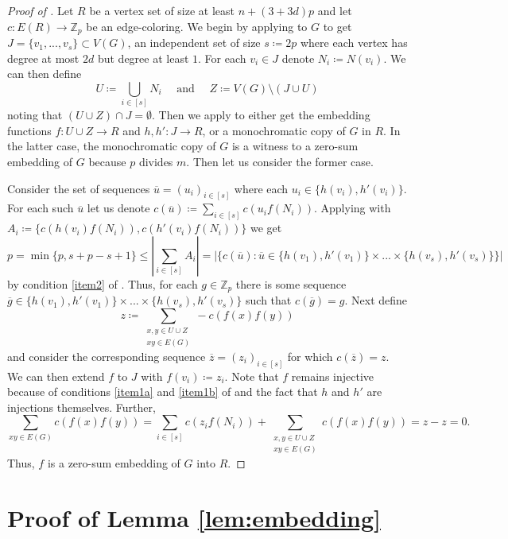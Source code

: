 \documentclass{article}
\newcommand\ZZ{{\mathbb Z}}
\theoremstyle{definition}
\begin{document}
\begin{proof}[Proof of ]

Let $R$ be a vertex set of size at least $n+(3+3d)p$ and let $c:E(R)\to \ZZ_p$ be an edge-coloring. We begin by applying 
 to $G$ to get $J=\{v_1,...,v_s\}\subset V(G)$, an independent set of size $s\coloneqq 2p$ where each vertex has degree at most $2d$ but degree at least $1$. For each $v_i\in J$ denote $N_i\coloneqq N(v_i)$. We can then define $$U\coloneqq \bigcup_{i\in [s]}N_i  \quad \text{ and } \quad Z\coloneqq V(G)\setminus (J\cup U)$$ noting that $(U\cup Z)\cap J=\emptyset$. Then we apply  to either get the embedding functions $f:U\cup Z\to R$ and $h,h':J\to R$, or a monochromatic copy of $G$ in $R$. In the latter case, the monochromatic copy of $G$ is a witness to a zero-sum embedding of $G$ because $p$ divides $m$. Then let us consider the former case.

Consider the set of sequences $\overline u=(u_i)_{i\in [s]}$ where each $u_i\in \{h(v_i),h'(v_i)\}$. For each such $\overline{u}$  let us denote $c(\overline u)\coloneqq \sum_{i\in [s]}c(u_if(N_i))$. Applying  with $A_i\coloneqq \{c(h(v_i)f(N_i)),c(h'(v_i)f(N_i))\}$ we get $$p=\min\{p,s+p-s+1\}\leq \left|\sum_{i\in [s]} A_i\right|= |\{c(\overline u):\overline u\in \{h(v_1),h'(v_1)\}\times...\times \{h(v_s),h'(v_s)\}\}|$$ by condition \ref{item2} of .
Thus, for each $g\in \mathbb{Z}_p$ there is some sequence $\overline g \in \{h(v_1),h'(v_1)\}\times...\times \{h(v_s),h'(v_s)\}$ such that $c(\overline g)=g$. Next define $$z\coloneqq \sum_{\substack{x,y\in U\cup Z\\ xy\in E(G)}}-c(f(x)f(y))$$ and consider the corresponding sequence $\overline z = (z_i)_{i\in [s]}$ for which $c(\overline{z})=z$. We can then extend $f$ to $J$ with $f(v_i)\coloneqq z_i$. Note that $f$ remains injective because of conditions \ref{item1a} and \ref{item1b} of  and the fact that $h$ and $h'$ are injections themselves. Further, $$\sum_{xy\in E(G)}c(f(x)f(y))=\sum_{i\in [s]}c(z_if(N_i))+\sum_{\substack{x,y\in U\cup Z\\ xy\in E(G)}}c(f(x)f(y))=z-z=0.$$
Thus, $f$ is a zero-sum embedding of $G$ into $R$.
\end{proof}

\section{Proof of Lemma \ref{lem:embedding}}\label{sec:lemma}
\end{document}
